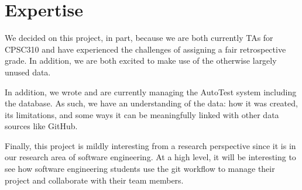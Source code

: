 \documentclass[preprint,journal]{vgtc}       %
\begin{document}

\section{Expertise}
We decided on this project, in part, because we are both currently TAs for CPSC310
and have experienced the challenges of assigning a fair retrospective grade. In
addition, we are both excited to make use of the otherwise largely unused data.

In addition, we wrote and are currently managing the AutoTest system including
the database. As such, we have an understanding of the data: how it was created,
its limitations, and some ways it can be meaningfully linked with other data sources
like GitHub.

Finally, this project is mildly interesting from a research perspective since it
is in our research area of software engineering. At a high level, it will be
interesting to see how software engineering students use the git workflow to
manage their project and collaborate with their team members.
\end{document}
